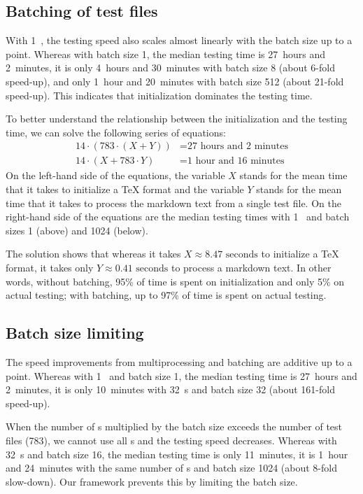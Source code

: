 \documentclass[final]{ltugboat}
\begin{document}
\subsection{Batching of test files}
With 1~, the testing speed also scales almost linearly with the batch size up to a point. Whereas with batch size 1, the median testing time is 27~hours and 2~minutes, it is only 4~hours and 30~minutes with batch size 8 (about 6-fold speed-up), and only 1~hour and 20~minutes with batch size 512 (about 21-fold speed-up). This indicates that initialization dominates the testing time.

To better understand the relationship between the initialization and the testing time, we can solve the following series of equations:
\begin{align*}
    14\cdot(783\cdot(X + Y)) &= \text{27 hours and 2 minutes} \\
    14\cdot(X + 783\cdot Y) &= \text{1 hour and 16 minutes}
\end{align*}
On the left-hand side of the equations, the variable $X$ stands for the mean time that it takes to initialize a \TeX{} format and the variable $Y$ stands for the mean time that it takes to process the markdown text from a single test file. On the right-hand side of the equations are the median testing times with 1~ and batch sizes 1 (above) and 1024 (below).

The solution shows that whereas it takes $X\approx\text{8.47 seconds}$ to initialize a \TeX{} format, it takes only $Y\approx\text{0.41 seconds}$ to process a markdown text. In other words, without batching, 95\% of time is spent on initialization and only 5\% on actual testing; with batching, up to 97\% of time is spent on actual testing.

\subsection{Batch size limiting}
The speed improvements from multiprocessing and batching are additive up to a point. Whereas with 1~ and batch size 1, the median testing time is 27~hours and 2~minutes, it is only 10~minutes with 32~s and batch size 32 (about 161-fold speed-up).

When the number of s multiplied by the batch size exceeds the number of test files (783), we cannot use all s and the testing speed decreases. Whereas with 32~s and batch size 16, the median testing time is only 11~minutes, it is 1~hour and 24~minutes with the same number of s and batch size 1024 (about 8-fold slow-down). Our framework prevents this by limiting the batch size.
\end{document}
